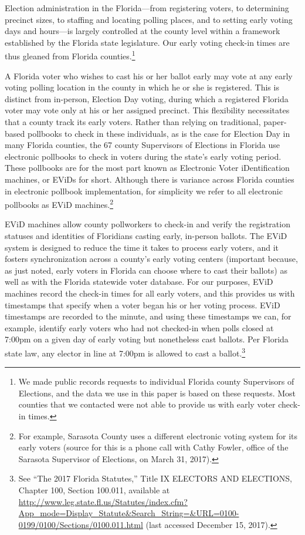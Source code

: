 \documentclass[12pt,titlepage]{article}
\begin{document}
Election administration in the Florida---from registering voters, to
determining precinct sizes, to staffing and locating polling places,
and to setting early voting days and hours---is largely controlled at
the county level within a framework established by the Florida state
legislature. Our early voting check-in times are thus gleaned from
Florida counties.\footnote{We made public records requests to
  individual Florida county Supervisors of Elections, and the data we
  use in this paper is based on these requests.  Most counties that we
  contacted were not able to provide us with early voter check-in
  times.}


A Florida voter who wishes to cast his or her ballot early may vote at
any early voting polling location in the county in which he or she is
registered.  This is distinct from in-person, Election Day voting,
during which a registered Florida voter may vote only at his or her
assigned precinct.  This flexibility necessitates that a county track
its early voters.  Rather than relying on traditional, paper-based
pollbooks to check in these individuals, as is the case for Election
Day in many Florida counties, the 67 county Supervisors of Elections
in Florida use electronic pollbooks to check in voters during the
state's early voting period.  These pollbooks are for the most part
known as Electronic Voter iDentification machines, or EViDs for short.
Although there is variance across Florida counties in electronic
pollbook implementation, for simplicity we refer to all electronic
pollbooks as EViD machines.\footnote{For example, Sarasota County uses
  a different electronic voting system for its early voters (source
  for this is a phone call with Cathy Fowler, office of the Sarasota
  Supervisor of Elections, on March 31, 2017).}


EViD machines allow county pollworkers to check-in and verify the
registration statuses and identities of Floridians casting early,
in-person ballots. The EViD system is designed to reduce the time it
takes to process early voters, and it fosters synchronization across a
county's early voting centers (important because, as just noted, early
voters in Florida can choose where to cast their ballots) as well as
with the Florida statewide voter database.  For our purposes, EViD
machines record the check-in times for all early voters, and this
provides us with timestamps that specify when a voter began his or her
voting process. EViD timestamps are recorded to the minute, and using
these timestamps we can, for example, identify early voters who had
not checked-in when polls closed at 7:00pm on a given day of early
voting but nonetheless cast ballots.  Per Florida state law, any
elector in line at 7:00pm is allowed to cast a ballot.\footnote{See
  ``The 2017 Florida Statutes,'' Title IX ELECTORS AND ELECTIONS,
  Chapter 100, Section 100.011, available at
  \url{http://www.leg.state.fl.us/Statutes/index.cfm?App\_mode=Display\_Statute\&Search\_String=\&URL=0100-0199/0100/Sections/0100.011.html}
  (last accessed December 15, 2017).}
\end{document}
